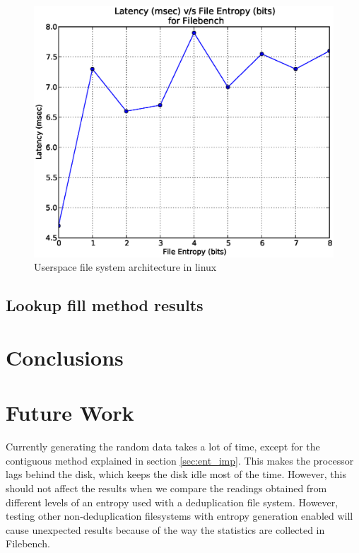 \begin{figure}
\label{fig:fuse}
\begin{center}
\includegraphics[scale=.55]{../results/read_latency.eps}
\caption{Userspace file system architecture in linux\cite{web:wiki-fuse}}
\end{center}
\end{figure}


\section{Lookup fill method results}


\chapter{Conclusions}\label{chap:conc}
\chapter{Future Work}\label{chap:fut}


Currently generating the random data takes a lot of time, except for the contiguous method explained in section \ref{sec:ent_imp}.
This makes the processor lags behind the disk, which keeps the disk idle most of the time.
 However, this should not affect the results when we compare the readings obtained from different levels of an entropy used with a deduplication file system.
 However, testing other non-deduplication filesystems with entropy generation enabled will cause unexpected results because of the way the statistics are collected in Filebench.
